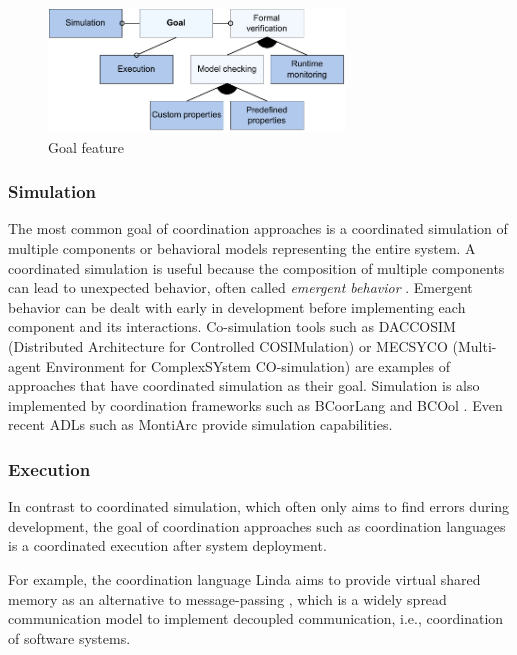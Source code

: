 \documentclass[runningheads]{llncs}
\begin{document}
\begin{figure}[ht]
	\centering
	\includegraphics[width=0.7\textwidth]{images/goal_feature}
	\caption{Goal feature}
	\label{fig:goalFeature}
\end{figure}

\subsubsection{Simulation} The most common goal of coordination approaches is a coordinated simulation of multiple components or behavioral models representing the entire system.
A coordinated simulation is useful because the composition of multiple components can lead to unexpected behavior, often called \textit{emergent behavior} \cite{ekerTamingHeterogeneityPtolemy2003}.
Emergent behavior can be dealt with early in development before implementing each component and its interactions.
Co-simulation tools such as DACCOSIM (Distributed Architecture for Controlled COSIMulation) \cite{galtierFMIBasedDistributedMultisimulation2015,dadSynthesisFeedbackDistribution2021} or MECSYCO (Multi-agent Environment for ComplexSYstem CO-simulation) \cite{camusHybridCosimulationFMUs2016,camusCosimulationCyberphysicalSystems2018} are examples of approaches that have coordinated simulation as their goal.
Simulation is also implemented by coordination frameworks such as BCoorLang \cite{krauterBehavioralConsistencyMultimodeling2023} and BCOol \cite{varalarsenBehavioralCoordinationOperator2015}.
Even recent ADLs such as MontiArc \cite{haberMontiArcArchitecturalModeling2014} provide simulation capabilities.

\subsubsection{Execution} In contrast to coordinated simulation, which often only aims to find errors during development, the goal of coordination approaches such as coordination languages is a coordinated execution after system deployment.

For example, the coordination language Linda aims to provide virtual shared memory as an alternative to message-passing \cite{carrieroLindaAlternativeMessagepassing1994}, which is a widely spread communication model to implement decoupled communication, i.e., coordination of software systems.
\end{document}
